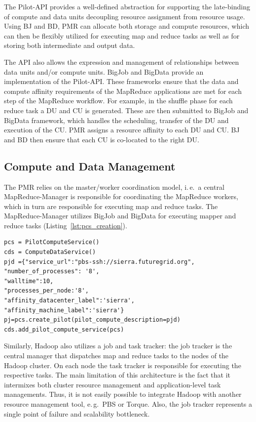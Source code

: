 \documentclass[12pt]{report}
\newcommand{\upp}{\vspace*{-0.5em}}
\begin{document}
The Pilot-API provides a well-defined abstraction for supporting the
late-binding of compute and data units decoupling resource assignment
from resource usage. Using BJ and BD, PMR can allocate both storage
and compute resources, which can then be flexibly utilized for
executing map and reduce tasks as well as for storing both
intermediate and output data.

The API also allows the expression and management of relationships
between data units and/or compute units. BigJob and BigData provide an
implementation of the Pilot-API. These frameworks ensure that the data
and compute affinity requirements of the MapReduce applications are
met for each step of the MapReduce workflow. For example, in the
shuffle phase for each reduce task a DU and CU is generated. These are
then submitted to BigJob and BigData framework, which handles the
scheduling, transfer of the DU and execution of the CU. PMR assigns a
resource affinity to each DU and CU. BJ and BD then ensure that each
CU is co-located to the right DU.

\upp
\subsection{Compute and Data Management}
The PMR relies on the master/worker coordination model, i.\,e.\ a
central MapReduce-Manager is responsible for coordinating the
MapReduce workers, which in turn are responsible for executing map and
reduce tasks. The MapReduce-Manager utilizes BigJob and BigData for executing
mapper and reduce tasks (Listing~\ref{lst:pcs_creation}).


\lstset{
language=Python,
frame=single,
captionpos=b,
stringstyle=\ttfamily,
basicstyle=\scriptsize\ttfamily
}
\noindent\begin{minipage}{1 \textwidth}
\begin{lstlisting}[caption={\textbf{Pilot Compute Creation:} Instantiation of a Pilot Job using Pilot Compute Description}, label={lst:pcs_creation}]
pcs = PilotComputeService()
cds = ComputeDataService()
pjd ={"service_url":"pbs-ssh://sierra.futuregrid.org", 
"number_of_processes": '8',
"walltime":10, 
"processes_per_node:'8',
"affinity_datacenter_label":'sierra',
"affinity_machine_label":'sierra'}
pj=pcs.create_pilot(pilot_compute_description=pjd)
cds.add_pilot_compute_service(pcs)
\end{lstlisting}
\end{minipage}

Similarly, Hadoop also utilizes a job and task tracker: the job
tracker is the central manager that dispatches map and reduce tasks to
the nodes of the Hadoop cluster. On each node the task tracker is
responsible for executing the respective tasks. The main limitation of
this architecture is the fact that it intermixes both cluster resource
management and application-level task managements. Thus, it is not
easily possible to integrate Hadoop with another resource management
tool, e.\,g.\ PBS or Torque. Also, the job tracker represents a single
point of failure and scalability bottleneck.
\end{document}
